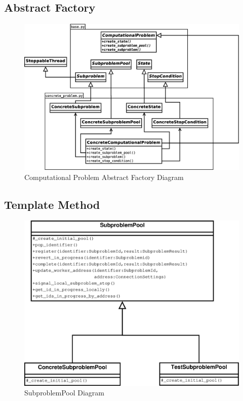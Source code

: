 \documentclass{article}
\begin{document}
\subsection{Abstract Factory}
\begin{figure}[H]
	\centering
	\includegraphics[width=\linewidth]{../diagrams/FactoryDiagram.eps}
	\caption{Computational Problem Abstract Factory Diagram}
\end{figure}

\subsection{Template Method}
\begin{figure}[H]
	\centering
	 \includegraphics[width=\linewidth]{../diagrams/SubproblemPoolDiagram.eps}
	\caption{SubproblemPool Diagram}
\end{figure}
\end{document}
